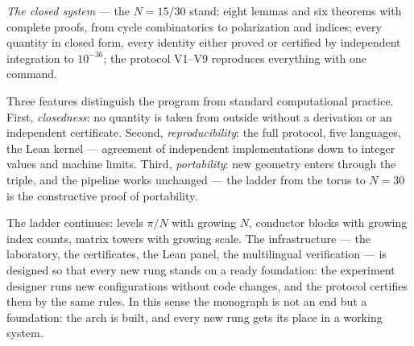 \emph{The closed system} --- the $N=15/30$ stand: eight lemmas and
six theorems with complete proofs, from cycle combinatorics to
polarization and indices; every quantity in closed form, every
identity either proved or certified by independent integration to
$10^{-36}$; the protocol V1--V9 reproduces everything with one
command.

Three features distinguish the program from standard computational
practice. First, \emph{closedness}: no quantity is taken from
outside without a derivation or an independent certificate. Second,
\emph{reproducibility}: the full protocol, five languages, the Lean
kernel --- agreement of independent implementations down to integer
values and machine limits. Third, \emph{portability}: new geometry
enters through the triple, and the pipeline works unchanged --- the
ladder from the torus to $N=30$ is the constructive proof of
portability.

The ladder continues: levels $\pi/N$ with growing $N$, conductor
blocks with growing index counts, matrix towers with growing scale.
The infrastructure --- the laboratory, the certificates, the Lean
panel, the multilingual verification --- is designed so that every
new rung stands on a ready foundation: the experiment designer runs
new configurations without code changes, and the protocol certifies
them by the same rules. In this sense the monograph is not an end
but a foundation: the arch is built, and every new rung gets its
place in a working system.
